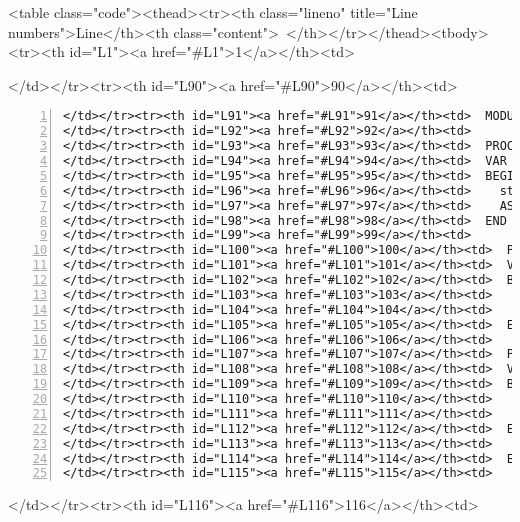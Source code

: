 <table class="code"><thead><tr><th class="lineno" title="Line numbers">Line</th><th class="content"> </th></tr></thead><tbody><tr><th id="L1"><a href="#L1">1</a></th><td>\documentclass[a4paper,11pt]{article}
\begin{document}
</td></tr><tr><th id="L90"><a href="#L90">90</a></th><td>\begin{lstlisting}[language=Oberon,frame=none,numbers=left]
</td></tr><tr><th id="L91"><a href="#L91">91</a></th><td>  MODULE TrapDemo;
</td></tr><tr><th id="L92"><a href="#L92">92</a></th><td>
</td></tr><tr><th id="L93"><a href="#L93">93</a></th><td>  PROCEDURE Proc2();
</td></tr><tr><th id="L94"><a href="#L94">94</a></th><td>  VAR string : POINTER TO ARRAY OF CHAR;
</td></tr><tr><th id="L95"><a href="#L95">95</a></th><td>  BEGIN
</td></tr><tr><th id="L96"><a href="#L96">96</a></th><td>    string := NIL;
</td></tr><tr><th id="L97"><a href="#L97">97</a></th><td>    ASSERT(string # NIL);
</td></tr><tr><th id="L98"><a href="#L98">98</a></th><td>  END Proc2;
</td></tr><tr><th id="L99"><a href="#L99">99</a></th><td>
</td></tr><tr><th id="L100"><a href="#L100">100</a></th><td>  PROCEDURE Proc1;
</td></tr><tr><th id="L101"><a href="#L101">101</a></th><td>  VAR a, b : LONGINT;
</td></tr><tr><th id="L102"><a href="#L102">102</a></th><td>  BEGIN
</td></tr><tr><th id="L103"><a href="#L103">103</a></th><td>    a := 99; b := 11;
</td></tr><tr><th id="L104"><a href="#L104">104</a></th><td>    Proc2();
</td></tr><tr><th id="L105"><a href="#L105">105</a></th><td>  END Proc1;
</td></tr><tr><th id="L106"><a href="#L106">106</a></th><td>
</td></tr><tr><th id="L107"><a href="#L107">107</a></th><td>  PROCEDURE Demo*;
</td></tr><tr><th id="L108"><a href="#L108">108</a></th><td>  VAR string : ARRAY 8 OF CHAR;
</td></tr><tr><th id="L109"><a href="#L109">109</a></th><td>  BEGIN
</td></tr><tr><th id="L110"><a href="#L110">110</a></th><td>    string := "Demo!";
</td></tr><tr><th id="L111"><a href="#L111">111</a></th><td>    Proc1();
</td></tr><tr><th id="L112"><a href="#L112">112</a></th><td>  END Demo;
</td></tr><tr><th id="L113"><a href="#L113">113</a></th><td>
</td></tr><tr><th id="L114"><a href="#L114">114</a></th><td>  END TrapDemo.
</td></tr><tr><th id="L115"><a href="#L115">115</a></th><td>\end{lstlisting}
</td></tr><tr><th id="L116"><a href="#L116">116</a></th><td>
\end{document}
